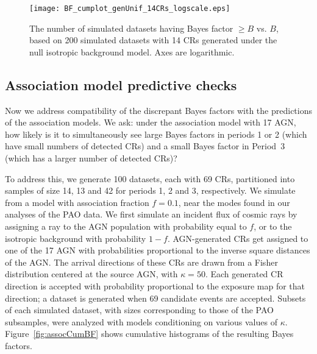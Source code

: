 \begin{figure}
\centerline{\texttt{[image: BF\_cumplot\_genUnif\_14CRs\_logscale.eps]}}
\caption{The number of simulated datasets having Bayes factor $\geq B$
vs. $B$, based on 200 simulated datasets with 14 CRs generated under the
null isotropic background model.  Axes are logarithmic.}
\label{fig:unifCumBF}
\end{figure}

\subsection{Association model predictive checks}

Now we address compatibility of the discrepant Bayes factors with the
predictions of the association models.  We ask: under the association model
with 17 AGN, how likely is it to simultaneously see large Bayes factors in
periods 1 or 2 (which have small numbers of detected CRs) and a small Bayes
factor in Period~3 (which has a larger number of detected CRs)?

To address this, we generate 100 datasets, each with 69 CRs, partitioned
into samples of size 14, 13 and 42 for periods 1, 2 and 3, respectively.  We
simulate from a model with association fraction $f=0.1$, near the modes
found in our analyses of the PAO data.  We first simulate an incident flux
of cosmic rays by assigning a ray to the AGN population with probability
equal to $f$, or to the isotropic background with probability $1-f$.
AGN-generated CRs get assigned to one of the 17 AGN with probabilities
proportional to the inverse square distances of the AGN. The arrival
directions of these CRs are drawn from a Fisher distribution centered at the
source AGN, with $\kappa = 50$.  Each generated CR direction is accepted
with probability proportional to the exposure map for that direction; a
dataset is generated when 69 candidate events are accepted.  Subsets
of each simulated dataset, with sizes corresponding to those of the
PAO subsamples, were analyzed with models conditioning on various
values of $\kappa$.  Figure~\ref{fig:assocCumBF} shows cumulative
histograms of the resulting Bayes factors.

